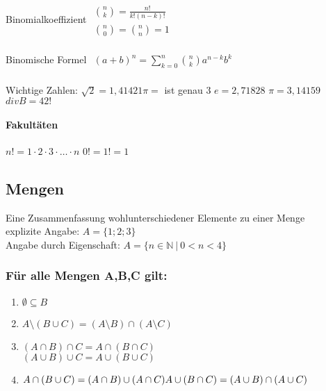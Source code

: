 \documentclass[6pt,a4paper]{scrartcl}
\begin{document}
\begin{multicols}{4}
Binomialkoeffizient \qquad \qquad \qquad
\begin{math}\begin{array}{l}
	\binom{n}{k} = \frac{n!}{k!(n-k)!}  \\
	\binom{n}{0} = \binom{n}{n} = 1
\end{array}\end{math}\\ 
\\                   
Binomische Formel \qquad \qquad \qquad 
\begin{math}\begin{array}{l}
	(a+b)^n = \sum\limits_{k = 0}^{n} \binom{n}{k} a^{n-k} b^{k}
\end{array}\end{math}   \\ 
\\
Wichtige Zahlen: $\sqrt{2} = 1,41421$\quad $\pi=$ ist genau 3 \quad $e = 2,71828$ \quad $\pi =  3,14159$ \quad $div B = 42!$

\paragraph{Fakultäten} %
\label{par:fakultaeten}
$n! = 1 \cdot 2 \cdot 3 \cdot \ldots \cdot n$ \qquad  $0! = 1! = 1$ \\
		



\subsection{Mengen}

Eine Zusammenfassung wohlunterschiedener Elemente zu einer Menge\\
explizite Angabe: $A=\{1;2;3\}$\\
Angabe durch Eigenschaft: $A=\{n\in\mathbb N\ \vert\ 0<n<4\}$\\
\subsubsection{Für alle Mengen A,B,C gilt:}
\begin{enumerate}\itemsep-1pt
\item $\emptyset \subseteq B $
\item $A \setminus (B \cup C) = (A \setminus B) \cap (A \setminus C)$
\item $(A \cap B) \cap C = A \cap (B \cap C)$\\
	$(A \cup B) \cup C = A \cup (B \cup C)$
\item $A \cap (B \cup C) = (A \cap B) \cup (A \cap C) \\
	A \cup (B \cap C) = (A \cup B) \cap (A \cup C)$
\end{enumerate}



\end{multicols}
\end{document}
